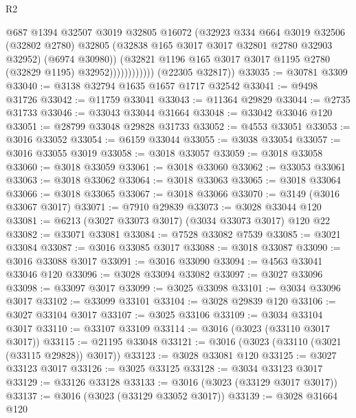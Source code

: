 \begin{lexlean}{R2}
\begin{coremodule}
                            @687
                            @1394
                            @32507
                            @3019
                            @32805
                            @16072
                            (@32923
                              @334
                              @664
                              @3019
                              @32506
                              (@32802 @2780)
                              @32805
                              (@32838 @165 @3017 @3017 @32801 @2780 @32903 @32952)
                              (@6974 @30980))
                            (@32821
                              @1196
                              @165
                              @3017
                              @3017
                              @1195
                              @2780
                              (@32829 @1195)
                              @32952))))))))))))
      (@22305 @32817))
@33035 := @30781 @3309
@33040 := @3138 @32794 @1635 @1657 @1717 @32542
@33041 := @9498 @31726
@33042 := @11759 @33041
@33043 := @11364 @29829
@33044 := @2735 @31733
@33046 := @33043 @33044 @31664
@33048 := @33042 @33046 @120
@33051 := @28799 @33048 @29828 @31733
@33052 := @4553 @33051
@33053 := @3016 @33052
@33054 := @6159 @33044
@33055 := @3038 @33054
@33057 := @3016 @33055 @3019
@33058 := @3018 @33057
@33059 := @3018 @33058
@33060 := @3018 @33059
@33061 := @3018 @33060
@33062 := @33053 @33061
@33063 := @3018 @33062
@33064 := @3018 @33063
@33065 := @3018 @33064
@33066 := @3018 @33065
@33067 := @3018 @33066
@33070 := @3149 (@3016 @33067 @3017)
@33071 := @7910 @29839
@33073 := @3028 @33044 @120
@33081 := @6213 (@3027 @33073 @3017) (@3034 @33073 @3017) @120 @22
@33082 := @33071 @33081
@33084 := @7528 @33082 @7539
@33085 := @3021 @33084
@33087 := @3016 @33085 @3017
@33088 := @3018 @33087
@33090 := @3016 @33088 @3017
@33091 := @3016 @33090
@33094 := @4563 @33041 @33046 @120
@33096 := @3028 @33094 @33082
@33097 := @3027 @33096
@33098 := @33097 @3017
@33099 := @3025 @33098
@33101 := @3034 @33096 @3017
@33102 := @33099 @33101
@33104 := @3028 @29839 @120
@33106 := @3027 @33104 @3017
@33107 := @3025 @33106
@33109 := @3034 @33104 @3017
@33110 := @33107 @33109
@33114 := @3016 (@3023 (@33110 @3017 @3017))
@33115 := @21195 @33048
@33121 := @3016 (@3023 (@33110 (@3021 (@33115 @29828)) @3017))
@33123 := @3028 @33081 @120
@33125 := @3027 @33123 @3017
@33126 := @3025 @33125
@33128 := @3034 @33123 @3017
@33129 := @33126 @33128
@33133 := @3016 (@3023 (@33129 @3017 @3017))
@33137 := @3016 (@3023 (@33129 @33052 @3017))
@33139 := @3028 @31664 @120

\end{coremodule}
\end{lexlean}
